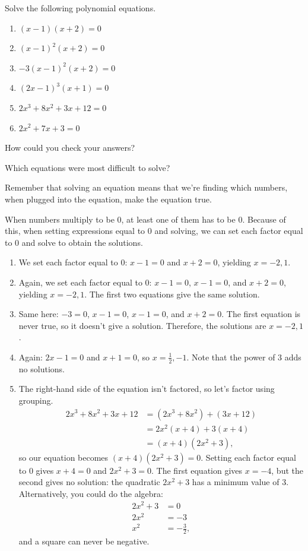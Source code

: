 \documentclass[noauthor]{ximera}
\begin{document}
\begin{problem}
Solve the following polynomial equations.

\begin{enumerate}
    \item \((x - 1)(x + 2) = 0\)
    \item \((x - 1)^2(x + 2) = 0\)
    \item \(-3(x - 1)^2(x + 2) = 0\)
    \item \((2x - 1)^3(x + 1) = 0\)
    \item \(2x^3 + 8x^2 + 3x + 12 = 0\)
    \item \(2x^2 + 7x + 3 = 0\)
\end{enumerate}

How could you check your answers? 

Which equations were most difficult to solve?

\begin{explanation}
Remember that solving an equation means that we're finding which numbers, when plugged into the equation, make the equation true.

When numbers multiply to be 0, at least one of them has to be 0. Because of this, when setting expressions equal to 0 and solving,
we can set each factor equal to 0 and solve to obtain the solutions.
    \begin{enumerate}
        \item We set each factor equal to 0: \(x - 1 = 0\) and \(x + 2 = 0\), yielding \(x = -2, 1\).
        \item Again, we set each factor equal to 0: \(x - 1 = 0\), \(x - 1 = 0\), and \(x + 2 = 0\), yielding \(x = -2, 1\). The first two equations give the same solution.
        \item Same here: \(-3 = 0\), \(x - 1 = 0\), \(x - 1 = 0\), and \(x + 2 = 0\). The first equation is never true, so it doesn't give a solution. Therefore,
        the solutions are \(x = -2, 1\).
        \item Again: \(2x - 1 = 0\) and \(x + 1 = 0\), so \(x = \frac{1}{2}, -1\). Note that the power of 3 adds no solutions.
        \item The right-hand side of the equation isn't factored, so let's factor using grouping.
        \begin{align*}
            2x^3 + 8x^2 + 3x + 12 & = (2x^3 + 8x^2) + (3x + 12) \\
            & = 2x^2(x + 4) + 3(x + 4) \\
            & = (x + 4)(2x^2 + 3),
        \end{align*}
        so our equation becomes \((x + 4)(2x^2 + 3) = 0\). Setting each factor equal to 0 gives \(x + 4 = 0\) and \(2x^2 + 3 = 0\). The first equation gives \(x = -4\), but
        the second gives no solution: the quadratic \(2x^2 + 3\) has a minimum value of 3. Alternatively, you could do the algebra:
        \begin{align*}
            2x^2 + 3 & = 0 \\
            2x^2 & = -3 \\
            x^2 & = -\frac{3}{2},
        \end{align*}
        and a square can never be negative.


\end{enumerate}
\end{explanation}
\end{problem}
\end{document}
